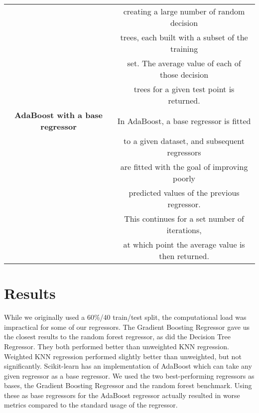 \documentclass[11pt]{article}
\begin{document}
\begin{table}[H]
\begin{tabular}{|c|c|}
&creating a large number of random decision \\
& trees, each built with a subset of the training \\
& set. The average value of each of those decision \\
& trees for a given test point is returned. \\ \hline
\textbf{AdaBoost with a base regressor} &  In AdaBoost, a base regressor is fitted \\
& to a given dataset, and subsequent regressors \\
& are fitted with the goal of improving poorly \\
& predicted values of the previous regressor. \\
& This continues for a set number of iterations, \\
& at which point the average value is then returned. \\ \hline
\end{tabular}
\label{table:regressors}
\end{table}

\section{Results}

While we originally used a 60\%/40\5 train/test split, the computational load was impractical for some of our regressors. The Gradient Boosting Regressor gave us the closest results to the random forest regressor, as did the Decision Tree Regressor.
They both performed better than unweighted KNN regression. Weighted KNN regression performed slightly better than unweighted, but not significantly.
Scikit-learn has an implementation of AdaBoost which can take any given regressor as a base regressor. We used the two best-performing regressors as bases, the Gradient Boosting Regressor and the random forest benchmark. Using these as base regressors for the AdaBoost regressor actually resulted in worse metrics compared to the standard usage of the regressor.\\
\end{document}
